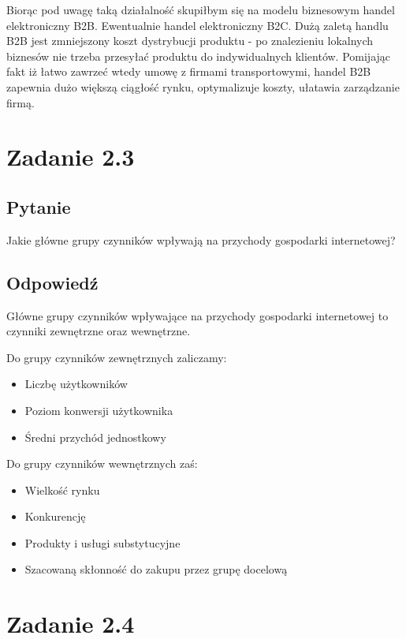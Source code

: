 \documentclass[paper=a4, fontsize=11pt]{scrartcl} %
\numberwithin{equation}{section} %
\numberwithin{figure}{section} %
\numberwithin{table}{section} %
\begin{document}
Biorąc pod uwagę taką działalność skupiłbym się na modelu biznesowym handel elektroniczny B2B. Ewentualnie handel elektroniczny B2C.
Dużą zaletą handlu B2B jest zmniejszony koszt dystrybucji produktu - po znalezieniu lokalnych biznesów nie trzeba przesyłać produktu
do indywidualnych klientów. Pomijając fakt iż łatwo zawrzeć wtedy umowę z firmami transportowymi, handel B2B zapewnia dużo większą
ciągłość rynku, optymalizuje koszty, ułatawia zarządzanie firmą.

\section{Zadanie 2.3}

\subsection {Pytanie}

Jakie główne grupy czynników wpływają na przychody gospodarki internetowej?

\subsection  {Odpowiedź}

Główne grupy czynników wpływające na przychody gospodarki internetowej to czynniki zewnętrzne oraz wewnętrzne.

Do grupy czynników zewnętrznych zaliczamy:

\begin {itemize}
  \item Liczbę użytkowników
  \item Poziom konwersji użytkownika
  \item Średni przychód jednostkowy
\end {itemize}

Do grupy czynników wewnętrznych zaś:

\begin {itemize}
  \item Wielkość rynku 
  \item Konkurencję
  \item Produkty i usługi substytucyjne
  \item Szacowaną skłonność do zakupu przez grupę docelową 
\end {itemize}

\section{Zadanie 2.4}
\end{document}
